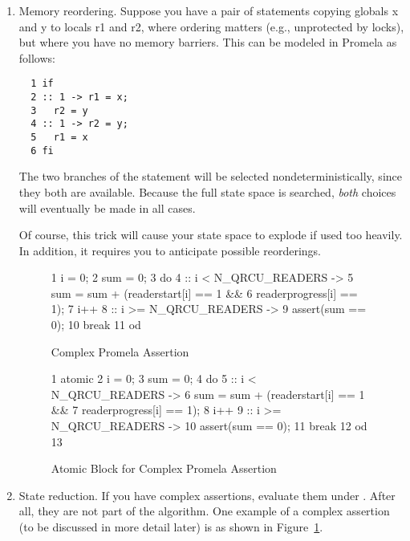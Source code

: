 \begin{enumerate}
\item	Memory reordering.  Suppose you have a pair of statements
	copying globals x and y to locals r1 and r2, where ordering
	matters (e.g., unprotected by locks), but where you have
	no memory barriers.  This can be modeled in Promela as follows:

\vspace{5pt}
\begin{minipage}[t]{\columnwidth}
\scriptsize
\begin{verbatim}
  1 if
  2 :: 1 -> r1 = x;
  3   r2 = y
  4 :: 1 -> r2 = y;
  5   r1 = x
  6 fi
\end{verbatim}
\end{minipage}
\vspace{5pt}

	The two branches of the  statement will be selected
	nondeterministically, since they both are available.
	Because the full state space is searched, \emph{both} choices
	will eventually be made in all cases.

	Of course, this trick will cause your state space to explode
	if used too heavily.
	In addition, it requires you to anticipate possible reorderings.

\begin{figure}[tbp]
{ \scriptsize
\begin{verbbox}
  1 i = 0;
  2 sum = 0;
  3 do
  4 :: i < N_QRCU_READERS ->
  5   sum = sum + (readerstart[i] == 1 &&
  6     readerprogress[i] == 1);
  7   i++
  8 :: i >= N_QRCU_READERS ->
  9   assert(sum == 0);
 10   break
 11 od
\end{verbbox}
}
\centering
\theverbbox
\caption{Complex Promela Assertion}
\label{fig:analysis:Complex Promela Assertion}
\end{figure}

\begin{figure}[tbp]
{ \scriptsize
\begin{verbbox}
  1 atomic {
  2   i = 0;
  3   sum = 0;
  4   do
  5   :: i < N_QRCU_READERS ->
  6     sum = sum + (readerstart[i] == 1 &&
  7       readerprogress[i] == 1);
  8     i++
  9   :: i >= N_QRCU_READERS ->
 10     assert(sum == 0);
 11     break
 12   od
 13 }
\end{verbbox}
}
\centering
\theverbbox
\caption{Atomic Block for Complex Promela Assertion}
\label{fig:analysis:Atomic Block for Complex Promela Assertion}
\end{figure}

\item	State reduction.  If you have complex assertions, evaluate
	them under .  After all, they are not part of the
	algorithm.  One example of a complex assertion (to be discussed
	in more detail later) is as shown in
	Figure~\ref{fig:analysis:Complex Promela Assertion}.


\end{enumerate}
